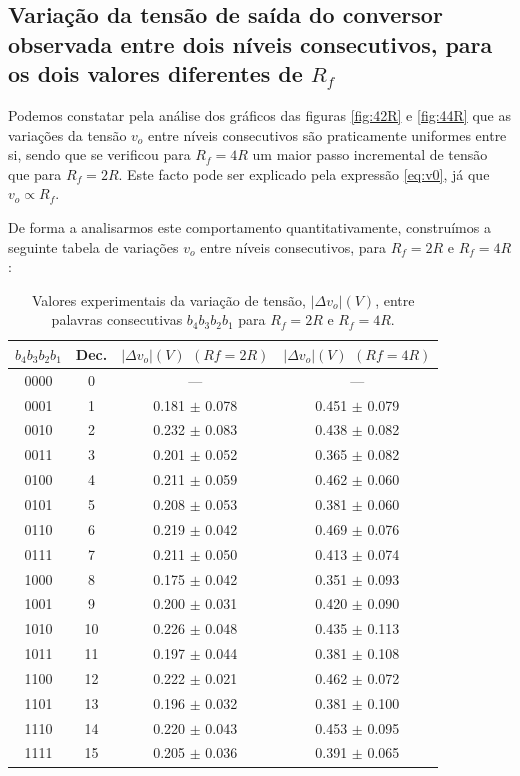 \documentclass[a4paper,11pt]{report}
\begin{document}
\subsection{Variação da tensão de saída do conversor observada entre dois níveis consecutivos, para os dois valores diferentes de $R_f$ } 

Podemos constatar pela análise dos gráficos das figuras \ref{fig:42R} e \ref{fig:44R} que as variações da tensão $v_o$ entre níveis consecutivos são praticamente uniformes entre si, sendo que se verificou para $R_f=4R$ um maior passo incremental de tensão que para $R_f=2R$. Este facto pode ser explicado pela expressão \ref{eq:v0}, já que $v_o\propto R_f$.

De forma a analisarmos este comportamento quantitativamente, construímos a seguinte tabela de variações $v_o$ entre níveis consecutivos, para $R_f=2R$ e $R_f=4R$:

\begin{table}[h]
\begin{center}
\begin{tabular}{ || c | c | c | c || }
\hline
	$b_4b_3b_2b_1$ & Dec. & $|\Delta v_o|(V)$ $(Rf=2R)$ & $|\Delta v_o|(V)$ $(Rf=4R)$ \\ \hline \hline
	0000 & 0 & --- & --- \\ \hline
	0001 & 1 & 0.181 $\pm$ 0.078 & 0.451 $\pm$ 0.079 \\ \hline
	0010 & 2 & 0.232 $\pm$ 0.083& 0.438 $\pm$ 0.082 \\ \hline
	0011 & 3 & 0.201 $\pm$ 0.052& 0.365 $\pm$ 0.082 \\ \hline
	0100 & 4 & 0.211 $\pm$ 0.059 & 0.462 $\pm$ 0.060\\ \hline
	0101 & 5 & 0.208 $\pm$ 0.053 & 0.381 $\pm$ 0.060 \\ \hline
	0110 & 6 & 0.219 $\pm$ 0.042 & 0.469 $\pm$ 0.076 \\ \hline
	0111 & 7 & 0.211 $\pm$ 0.050 & 0.413 $\pm$ 0.074 \\ \hline
	1000 & 8 & 0.175 $\pm$ 0.042& 0.351 $\pm$ 0.093 \\ \hline
	1001 & 9 & 0.200 $\pm$ 0.031 & 0.420 $\pm$ 0.090 \\ \hline
	1010 & 10 & 0.226 $\pm$ 0.048 & 0.435 $\pm$ 0.113 \\ \hline
	1011 & 11 & 0.197 $\pm$ 0.044 & 0.381 $\pm$ 0.108 \\ \hline
	1100 & 12 & 0.222 $\pm$ 0.021 & 0.462 $\pm$ 0.072\\ \hline
	1101 & 13 & 0.196 $\pm$ 0.032 & 0.381 $\pm$ 0.100 \\ \hline
	1110 & 14 & 0.220 $\pm$ 0.043 & 0.453 $\pm$ 0.095 \\ \hline
	1111 & 15 & 0.205 $\pm$ 0.036 & 0.391 $\pm$ 0.065 \\ \hline
\end{tabular}

\caption{Valores experimentais da variação de tensão, $|\Delta v_o|(V)$, entre palavras consecutivas $b_4b_3b_2b_1$ para $R_f=2R$ e $R_f=4R$.\label{tab:4.1}}
\end{center}
\end{table}
\end{document}
